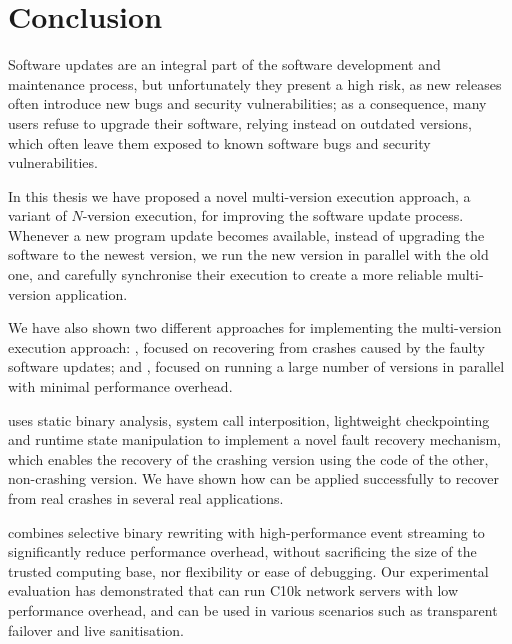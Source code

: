 \chapter{Conclusion}
\label{chap:conclusion}

Software updates are an integral part of the software development and
maintenance process, but unfortunately they present a high risk, as new
releases often introduce new bugs and security vulnerabilities; as a
consequence, many users refuse to upgrade their software, relying instead on
outdated versions, which often leave them exposed to known software bugs and
security vulnerabilities.

In this thesis we have proposed a novel multi-version execution approach, a
variant of $N$-version execution, for improving the software update process.
Whenever a new program update becomes available, instead of upgrading the
software to the newest version, we run the new version in parallel with the old
one, and carefully synchronise their execution to create a more reliable
multi-version application.


We have also shown two different approaches for implementing the multi-version
execution approach: \mx, focused on recovering from crashes caused by the
faulty software updates; and \varan, focused on running a large number of
versions in parallel with minimal performance overhead.

\mx uses static binary analysis, system call interposition, lightweight
checkpointing and runtime state manipulation to implement a novel fault recovery
mechanism, which enables the recovery of the crashing version using the code
of the other, non-crashing version. We have shown how \mx can be applied
successfully to recover from real crashes in several real applications.

\varan combines selective binary rewriting with high-performance event
streaming to significantly reduce performance overhead, without sacrificing the
size of the trusted computing base, nor flexibility or ease of debugging.  Our
experimental evaluation has demonstrated that \varan can run C10k network
servers with low performance overhead, and can be used in various scenarios
such as transparent failover and live sanitisation.

